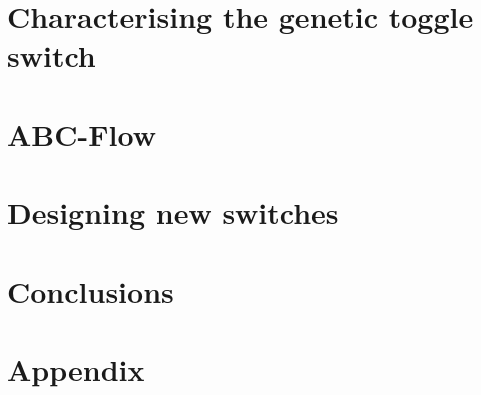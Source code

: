 \documentclass[]{phdthesis}
\begin{document}
\mainmatter*
\chapter{Characterising the genetic toggle switch}



\mainmatter*
\chapter{ABC-Flow}


\mainmatter*
\chapter{Designing new switches}


\mainmatter*
\chapter{Conclusions}


\printbibliography

\appendix*
\chapter{Appendix}

\end{document}
